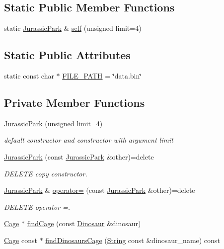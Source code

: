 \subsection*{Static Public Member Functions}
\begin{DoxyCompactItemize}
\item 
static \hyperlink{classJurassicPark}{Jurassic\+Park} \& \hyperlink{classJurassicPark_ae6cd7ff3eaec5f2e52b7dab2dfb7b5df}{self} (unsigned limit=4)
\end{DoxyCompactItemize}
\subsection*{Static Public Attributes}
\begin{DoxyCompactItemize}
\item 
static const char $\ast$ \hyperlink{classJurassicPark_a0997428c12ee5be9fb69c87415cab85b}{F\+I\+L\+E\+\_\+\+P\+A\+TH} = \char`\"{}data.\+bin\char`\"{}
\end{DoxyCompactItemize}
\subsection*{Private Member Functions}
\begin{DoxyCompactItemize}
\item 
\hyperlink{classJurassicPark_afe445635eccef6d51146e3cc519644ef}{Jurassic\+Park} (unsigned limit=4)
\begin{DoxyCompactList}\small\item\em default constructor and constructor with argument limit \end{DoxyCompactList}\item 
\hyperlink{classJurassicPark_a8d267bb3de6c8047b3502167c6889ab3}{Jurassic\+Park} (const \hyperlink{classJurassicPark}{Jurassic\+Park} \&other)=delete
\begin{DoxyCompactList}\small\item\em D\+E\+L\+E\+TE copy constructor. \end{DoxyCompactList}\item 
\hyperlink{classJurassicPark}{Jurassic\+Park} \& \hyperlink{classJurassicPark_ab229e57fe698d5916b6197fb05742b9d}{operator=} (const \hyperlink{classJurassicPark}{Jurassic\+Park} \&other)=delete
\begin{DoxyCompactList}\small\item\em D\+E\+L\+E\+TE operator =. \end{DoxyCompactList}\item 
\hyperlink{classCage}{Cage} $\ast$ \hyperlink{classJurassicPark_af96203bbb3eea734f56ca1c0e61904a8}{find\+Cage} (const \hyperlink{classDinosaur}{Dinosaur} \&dinosaur)
\item 
\hyperlink{classCage}{Cage} const  $\ast$ \hyperlink{classJurassicPark_a73388ce7377a823a73ce912a342c89b6}{find\+Dinosaurs\+Cage} (\hyperlink{classString}{String} const \&dinosaur\+\_\+name) const
\end{DoxyCompactItemize}
